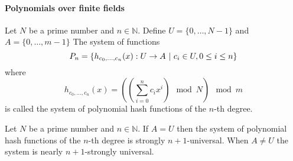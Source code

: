 \paragraph{Polynomials over finite fields}
\begin{definition}
Let $N$ be a prime number and $n \in \mathbb{N}$. Define $U = \{0, \dots, N - 1 \}$ and $A = \{0, \dots, m - 1\}$ The system of functions \[ P_n = \left\lbrace h_{c_0, \dots, c_n}(x): U \rightarrow A \ | \  c_i \in U, 0 \leq i \leq n \right\rbrace \] where \[ h_{c_0, \dots, c_n}(x) = \left( \left(\displaystyle \sum_{i=0}^{n} c_i x^i \right) \mod N \right) \mod m \] is called the system of polynomial hash functions of the $n$-th degree.
\end{definition}

\begin{remark}
Let $N$ be a prime number and $n \in \mathbb{N}$. If $A = U$ then the system of polynomial hash functions of the $n$-th degree is strongly $n + 1$-universal. When $A \neq U$ the system is nearly $n + 1$-strongly universal.
\end{remark}
